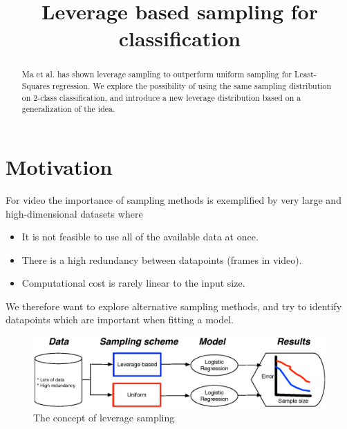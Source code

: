 \documentclass{article}
\title{Leverage based sampling for classification }
\begin{document}
%

\maketitle
%
\begin{abstract}
%
Ma et al. \cite{Ma} has shown leverage sampling to outperform uniform sampling for Least-Squares regression. We explore the possibility of using the same sampling distribution on 2-class classification, and introduce a new leverage distribution based on a generalization of the idea.
%
\end{abstract}

\section{Motivation}
For video the importance of sampling methods is exemplified by very large and high-dimensional datasets where

\begin{itemize}
\item It is not feasible to use all of the available data at once.
\item There is a high redundancy between datapoints (frames in video).
\item Computational cost is rarely linear to the input size.
\end{itemize}

We therefore want to explore alternative sampling methods, and try to identify datapoints which are important when fitting a model.
%

\begin{figure}[b]
\centering
\includegraphics[width=\linewidth]{images/ThoughtModel}
\caption{The concept of leverage sampling}
\label{fig:concept}
\end{figure}
\end{document}
